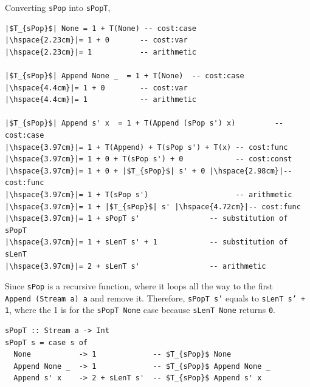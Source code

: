 \documentclass[12pt]{article}
\newcommand{\haskell}{\texttt}
\begin{document}
Converting \haskell{sPop} into \haskell{sPopT},
\begin{mdframed}
\begin{verbatim}
|$T_{sPop}$| None = 1 + T(None) -- cost:case
|\hspace{2.23cm}|= 1 + 0       -- cost:var
|\hspace{2.23cm}|= 1           -- arithmetic

|$T_{sPop}$| Append None _  = 1 + T(None)  -- cost:case
|\hspace{4.4cm}|= 1 + 0        -- cost:var
|\hspace{4.4cm}|= 1            -- arithmetic

|$T_{sPop}$| Append s' x  = 1 + T(Append (sPop s') x)         -- cost:case
|\hspace{3.97cm}|= 1 + T(Append) + T(sPop s') + T(x) -- cost:func
|\hspace{3.97cm}|= 1 + 0 + T(sPop s') + 0            -- cost:const
|\hspace{3.97cm}|= 1 + 0 + |$T_{sPop}$| s' + 0 |\hspace{2.98cm}|-- cost:func
|\hspace{3.97cm}|= 1 + T(sPop s')                    -- arithmetic
|\hspace{3.97cm}|= 1 + |$T_{sPop}$| s' |\hspace{4.72cm}|-- cost:func
|\hspace{3.97cm}|= 1 + sPopT s'                -- substitution of sPopT
|\hspace{3.97cm}|= 1 + sLenT s' + 1            -- substitution of sLenT
|\hspace{3.97cm}|= 2 + sLenT s'                -- arithmetic
\end{verbatim}
Since \haskell{sPop} is a recursive function, where it loops all the way to the first \\ \haskell{Append (Stream a) a} and remove it. Therefore, \haskell{sPopT s'} equals to \haskell{sLenT s' + 1}, where the 1 is for the \haskell{sPopT None} case because \haskell{sLenT None} returns \haskell{0}.

\begin{verbatim}
sPopT :: Stream a -> Int
sPopT s = case s of
  None           -> 1             -- $T_{sPop}$ None  
  Append None _  -> 1             -- $T_{sPop}$ Append None _
  Append s' x    -> 2 + sLenT s'  -- $T_{sPop}$ Append s' x
\end{verbatim}
\end{mdframed}
\end{document}
